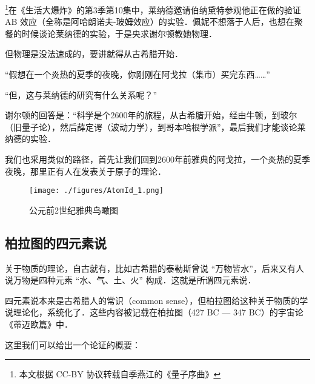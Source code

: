 
\footnote{本文根据 CC-BY 协议转载自季燕江的《量子序曲》}在《生活大爆炸》的第3季第10集中，莱纳德邀请伯纳黛特参观他正在做的验证 AB 效应（全称是阿哈朗诺夫-玻姆效应）的实验．佩妮不想落于人后，也想在聚餐的时候谈论莱纳德的实验，于是央求谢尔顿教她物理．

但物理是没法速成的，要讲就得从古希腊开始．

“假想在一个炎热的夏季的夜晚，你刚刚在阿戈拉（集市）买完东西……”

“但，这与莱纳德的研究有什么关系呢？”

谢尔顿的回答是：“科学是个2600年的旅程，从古希腊开始，经由牛顿，到玻尔（旧量子论），然后薛定谔（波动力学），到哥本哈根学派”，最后我们才能谈论莱纳德的实验．

我们也采用类似的路径，首先让我们回到2600年前雅典的阿戈拉，一个炎热的夏季夜晚，那里正有人在发表关于原子的理论．

\begin{figure}[ht]
\centering
\texttt{[image: ./figures/AtomId\_1.png]}
\caption{公元前2世纪雅典鸟瞰图} \label{AtomId_fig1}
\end{figure}

\subsection{柏拉图的四元素说}

关于物质的理论，自古就有，比如古希腊的泰勒斯曾说 “万物皆水”，后来又有人说万物是四种元素 “水、气、土、火” 构成．这就是所谓四元素说．

四元素说本来是古希腊人的常识（common sense），但柏拉图给这种关于物质的学说理论化，系统化了．这些内容被记载在柏拉图（427 BC — 347 BC）的宇宙论《蒂迈欧篇》中．

这里我们可以给出一个论证的概要：

